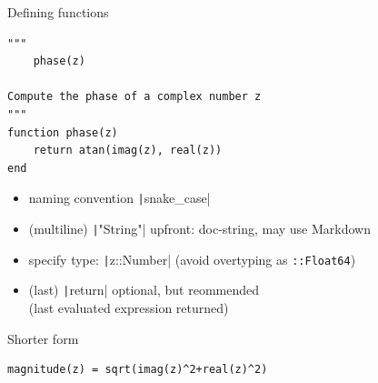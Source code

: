 \documentclass[aspectratio=169, 12pt]{beamer}
\begin{document}
    \begin{frame}[fragile]{Defining functions}
        \begin{verbatim}
"""
    phase(z)

Compute the phase of a complex number z
"""
function phase(z)
    return atan(imag(z), real(z))
end
        \end{verbatim}
        \begin{itemize}[<+->]
            \item \alert{naming convention} \texttt|snake_case|
            \item (multiline) \texttt|"String"| upfront: doc-string, may use  Markdown
            \item specify type: \texttt|z::Number| (\alert{avoid} overtyping as \texttt{::Float64})
            \item (last) \texttt|return| optional, but reommended\\
            \hfill(last evaluated expression returned)
        \end{itemize}
    \pause
    Shorter form
    \begin{verbatim}
magnitude(z) = sqrt(imag(z)^2+real(z)^2)
    \end{verbatim}
    \end{frame}
\end{document}
